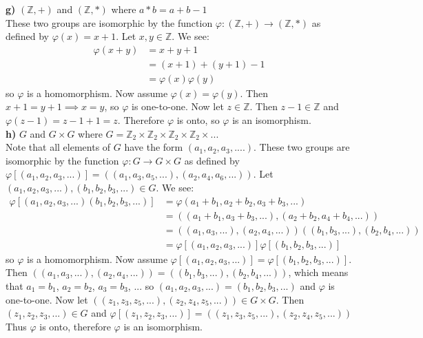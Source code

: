 \documentclass{scrartcl}
\begin{document}
\textbf{g)} $(\mathbb{Z},+)$ and $(\mathbb{Z},*)$ where $a*b=a+b-1$\\
These two groups are isomorphic by the function $\varphi : (\mathbb{Z},+)
\rightarrow  (\mathbb{Z},*)$ as defined by $\varphi(x)=x+1$.
Let $x,y \in \mathbb{Z}$. We see:
\begin{align*}
\varphi(x+y) &= x+y+1\\
             &= (x+1)+(y+1)-1\\
             &= \varphi(x)\varphi(y)
\end{align*}
so $\varphi$ is a homomorphism. Now assume $\varphi(x)=\varphi(y)$. Then
$x+1=y+1 \implies x=y$, so $\varphi$ is one-to-one. Now let $z \in \mathbb{Z}$.
Then $z-1 \in \mathbb{Z}$ and $\varphi(z-1) = z-1+1 = z$. Therefore $\varphi$ is
onto, so $\varphi$ is an isomorphism.\\

\textbf{h)} $G$ and $G \times G$ where $G=\mathbb{Z}_2 \times \mathbb{Z}_2
\times \mathbb{Z}_2 \times \mathbb{Z}_2 \times...$\\
Note that all elements of $G$ have the form $(a_1,a_2,a_3,....)$. These two
groups are isomorphic by the function $\varphi : G \rightarrow G \times G$ as
defined by $\varphi[(a_1,a_2,a_3,...)]=\left((a_1,a_3,a_5,...),(a_2,a_4,a_6,...)\right)$.
Let $(a_1,a_2,a_3,...),(b_1,b_2,b_3,...) \in G$. We see:
\begin{align*}
\varphi[(a_1,a_2,a_3,...)(b_1,b_2,b_3,...)]
 &= \varphi(a_1+b_1,a_2+b_2,a_3+b_3,...)\\
 &= \left((a_1+b_1,a_3+b_3,...),(a_2+b_2,a_4+b_4,...)\right)\\
 &= \left((a_1,a_3,...),(a_2,a_4,...)\right)\left((b_1,b_3,...),(b_2,b_4,...)\right)\\
 &= \varphi[(a_1,a_2,a_3,...)]\varphi[(b_1,b_2,b_3,...)]
\end{align*}
so $\varphi$ is a homomorphism. Now assume $\varphi[(a_1,a_2,a_3,...)] = 
\varphi[(b_1,b_2,b_3,...)]$. Then $\left((a_1,a_3,...),(a_2,a_4,...)\right) =
\left((b_1,b_3,...),(b_2,b_4,...)\right)$, which means that $a_1=b_1$, $a_2=b_2$,
 $a_3=b_3$, ... so $(a_1,a_2,a_3,...)=(b_1,b_2,b_3,...)$ and $\varphi$ is one-to-one. Now let 
$\left((z_1,z_3,z_5,...),(z_2,z_4,z_5,...)\right) \in G \times G$. Then 
$(z_1,z_2,z_3,...) \in G$ and $\varphi[(z_1,z_2,z_3,...)] =
\left((z_1,z_3,z_5,...),(z_2,z_4,z_5,...)\right)$ Thus $\varphi$ is onto, therefore $\varphi$ is an isomorphism.\\
\end{document}

